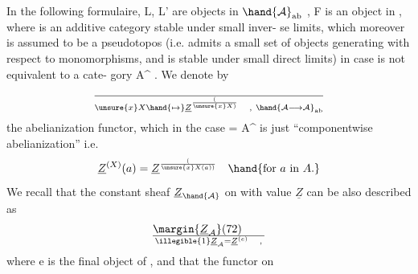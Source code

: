 In the following formulaire, L, L' are objects in $\hand{\mathcal{A}}_{\mathrm{ab}}$ , F is an
object in , where  is an additive category stable under small inver-%
\margin{$\times$}se limits, which moreover is assumed to be a pseudotopos (i.e. admits
a small set of objects generating with respect to monomorphisms, and is
stable under small direct limits) in case   is not equivalent to a cate-%
gory A\^{} . We denote by 
\[
\over{\unsure{x}}{X}\hand{\mapsto}\underline{Z}^{(\over{\unsure{x}}{X})} \quad , \ \hand{\mathcal{A}\longrightarrow\mathcal{A}}_{\mathrm{ab}}
\]
the abelianization functor, which in  the case   = A\^{} is just
``componentwise abelianization'' i.e.
\[
\underline{Z}^{(X)}(a) = \underline{Z}^{(\over{\unsure{x}}{X}(a))} \quad \hand{\text{for }a\text{ in }A.}
\]
We recall that the constant sheaf $\underline{Z}_{\hand{\mathcal{A}}}$ on  with value $\underline{Z}$ can be also
described as
\[
\margin{\underline{Z}_{\mathcal{A}}}(72)\qquad \over{\illegible{1}}{\underline{Z}_{\mathcal{A}}} = \underline{Z}^{(e)} \quad ,
\]
where e is the final object of  , and that the \hand{\uline{\textcolor{black}{sections}}} functor on 

